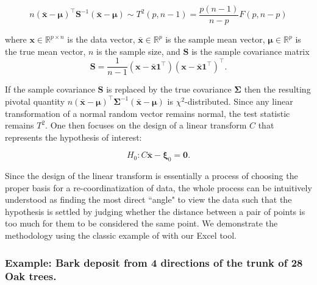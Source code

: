 \documentclass[article]{jss}
\numberwithin{equation}{subsection}
\begin{document}
        \[n{\left( {\bar{\textbf{x}} - {\boldsymbol{\mu}}} \right)^ \intercal}{\textbf{S}^{ - 1}}\left( {\bar{\textbf{x}} - {\boldsymbol{\mu}}} \right) \sim T^2(p, n-1) = \frac{{p\left( {n - 1} \right)}}{{n - p}}F\left( {p,n - p} \right) \]
        
        where $\textbf{x} \in \mathbb{R}^{p\times n}$ is the data vector, 
        $\bar{\textbf{x}} \in \mathbb{R}^p$ is the sample mean vector, 
        $\boldsymbol{\mu} \in \mathbb{R}^p$ is the true mean vector,
        $n$ is the sample size, and 
        $\textbf{S}$ is the sample covariance matrix
        \[\textbf{S} = \frac{1}{{n - 1}}\left( {\textbf{x} - \bar{\textbf{x}}{\textbf{1}^\intercal}} \right){\left( {\textbf{x} - \bar{\textbf{x}}{\textbf{1}^\intercal}} \right)^\intercal}.\]
        
        
        If the sample covariance $\textbf{S}$ is replaced by the true covariance
        $\boldsymbol{\Sigma}$ then the resulting pivotal quantity $n{\left( {\bar{\textbf{x}} - {\boldsymbol{\mu}}} \right)^ \intercal}{\boldsymbol{\Sigma}^{ - 1}}\left( {\bar{\textbf{x}} - {\boldsymbol{\mu}}} \right)$
        is $\chi^2$-distributed.
        Since any linear transformation of a normal random vector remains normal, the test statistic remains $T^2$. One then focuses on the design of a linear transform $C$ that represents the hypothesis of interest: 
        
        \[H_0: C\bar{\textbf{x}} - \boldsymbol{\xi}_0 = \textbf{0}.\]
        
        
        
        Since the design of the linear transform is essentially a process of choosing the proper basis for a re-coordinatization of data, the whole process can be intuitively understood as finding the most direct ``angle" to view the data such that the hypothesis is settled by judging whether the distance between a pair of points is too much for them to be considered the same point. We demonstrate the methodology using the classic example of \cite{rao1948corkboring} with our Excel tool.
        
        
        
        \subsubsection{Example: Bark deposit from 4 directions of the trunk of 28 Oak trees.}
        
\end{document}

